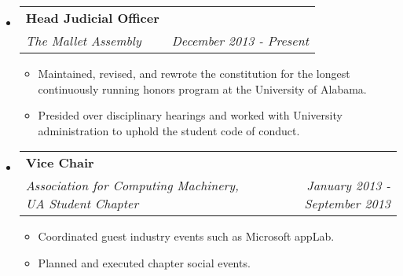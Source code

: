\documentclass[letterpaper,10pt]{article}
\makeatletter
\newcommand{\resitem}[1]{\item #1 \vspace{-2pt}}
\newcommand{\ressubheading}[4]{
    \begin{tabular*}{6.5in}{l@{\cftdotfill{\cftsecdotsep}\extracolsep{\fill}}r}
      \textbf{#1} & #2 \\
      \textit{#3} & \textit{#4} \\
  \end{tabular*}\vspace{-6pt}}
\makeatother
\begin{document}

  \begin{itemize}

    \item
      \ressubheading{Head Judicial Officer}{}{The Mallet Assembly}{December 2013 - Present}
      \begin{itemize}
          \resitem{Maintained, revised, and rewrote the constitution for the longest continuously running honors program at the University of Alabama.}
          \resitem{Presided over disciplinary hearings and worked with University administration to uphold the student code of conduct.}
      \end{itemize}

    \item
      \ressubheading{Vice Chair}{}{Association for Computing Machinery, UA Student Chapter}{January 2013 - September 2013}
      \begin{itemize}
          \resitem{Coordinated guest industry events such as Microsoft appLab.}
          \resitem{Planned and executed chapter social events.}
      \end{itemize}

  \end{itemize}

  
\end{document}
